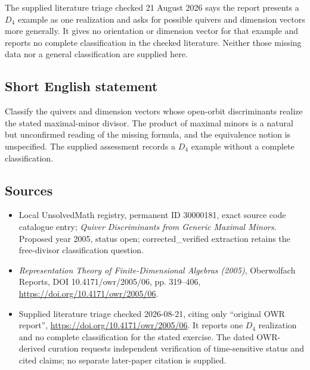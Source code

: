 \documentclass[11pt]{article}
\begin{document}
The supplied literature triage checked 21 August 2026 says the report presents a $D_4$ example as one realization and asks for possible quivers and dimension vectors more generally. It gives no orientation or dimension vector for that example and reports no complete classification in the checked literature. Neither those missing data nor a general classification are supplied here.
\subsection{Short English statement}
Classify the quivers and dimension vectors whose open-orbit discriminants realize the stated maximal-minor divisor. The product of maximal minors is a natural but unconfirmed reading of the missing formula, and the equivalence notion is unspecified. The supplied assessment records a $D_4$ example without a complete classification.
\subsection{Sources}
\begin{itemize}
\item Local UnsolvedMath registry, permanent ID 30000181, exact source code catalogue entry; \emph{Quiver Discriminants from Generic Maximal Minors}. Proposed year 2005, status open; corrected\_verified extraction retains the free-divisor classification question.
\item \emph{Representation Theory of Finite-Dimensional Algebras (2005)}, Oberwolfach Reports, DOI 10.4171/owr/2005/06, pp. 319--406, \url{https://doi.org/10.4171/owr/2005/06}.
\item Supplied literature triage checked 2026-08-21, citing only ``original OWR report'', \url{https://doi.org/10.4171/owr/2005/06}. It reports one $D_4$ realization and no complete classification for the stated exercise. The dated OWR-derived curation requests independent verification of time-sensitive status and cited claims; no separate later-paper citation is supplied.
\end{itemize}
\end{document}
